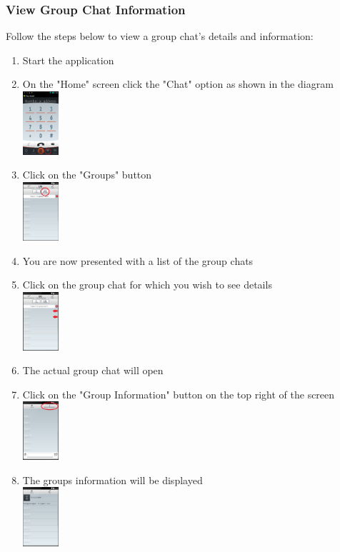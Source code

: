 \documentclass[11pt]{article}
\begin{document}
\subsubsection{View Group Chat Information}  \label{info}
Follow the steps below to view a group chat's details and information:
\begin{enumerate}
\item Start the application
\item On the "Home" screen click the "Chat" option as shown in the diagram\\
\includegraphics[width=50px]{images/mainScreen.png}
\item Click on the "Groups" button\\
\includegraphics[width=50px]{images/ChatlistNav.png}
\item You are now presented with a list of the group chats
\item Click on the group chat for which you wish to see details\\
\includegraphics[width=50px]{images/Grouplist.png}
\item The actual group chat will open
\item Click on the "Group Information" button on the top right of the screen\\
\includegraphics[width=50px]{images/groupchatInfo.png}
\item The groups information will be displayed\\
\includegraphics[width=50px]{images/groupchatInfoDisp.png}
\end{enumerate}
\end{document}
